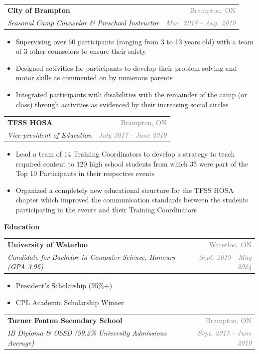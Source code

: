 \documentclass[letterpaper,11pt]{article}
\makeatletter
\newcommand{\resheading}[1]{{\large \colorbox{LightMidnightBlue}{\begin{minipage}{\textwidth}{\textbf{\textrm{#1 \vphantom{p\^{E}}}}}\end{minipage}}}}
\newcommand{\ressubheading}[4]{
\begin{tabular*}{7in}{l@{\extracolsep{\fill}}r}
		\textbf{#1} & \textcolor{gray}{#2} \\
		\textit{#3} & \textcolor{gray}{\textit{#4}} \\
\end{tabular*}\vspace{-6pt}}
\makeatother
\begin{document}
    \ressubheading{City of Brampton}{Brampton, ON}{Seasonal Camp Counselor \& Preschool Instructor}{Mar. 2018 - Aug. 2019}
        \begin{itemize}
            \item Supervising over 60 participants (ranging from 3 to 13 years old) with a team of 3 other counselors to ensure their safety
            \item Designed activities for participants to develop their problem solving and motor skills as commented on by numerous parents
            \item Integrated participants with disabilities with the remainder of the camp (or class) through activities as evidenced by their increasing social circles
        \end{itemize}
    
    \ressubheading{TFSS HOSA}{Brampton, ON}{Vice-president of Education}{July 2017 - June 2019}
    \begin{itemize}
        \item Lead a team of 14 Training Coordinators to develop a strategy to teach required content to 120 high school students from which 35 were part of the Top 10 Participants in their respective events
        \item Organized a completely new educational structure for the TFSS HOSA chapter which improved the communication standards between the students participating in the events and their Training Coordinators
    \end{itemize}

\resheading{Education}

\vspace{2.5mm}

\ressubheading{University of Waterloo}{Waterloo, ON}{Candidate for Bachelor in Computer Science, Honours (GPA 3.96)}{Sept. 2019 - May 2024}

\begin{itemize}
    \item President's Scholarship (95\%+)
    \item CPL Academic Scholarship Winner
\end{itemize}

\ressubheading{Turner Fenton Secondary School}{Brampton, ON}{IB Diploma \& OSSD (99.2\% University Admissions Average)}{Sept. 2015 - June 2019}
\end{document}
